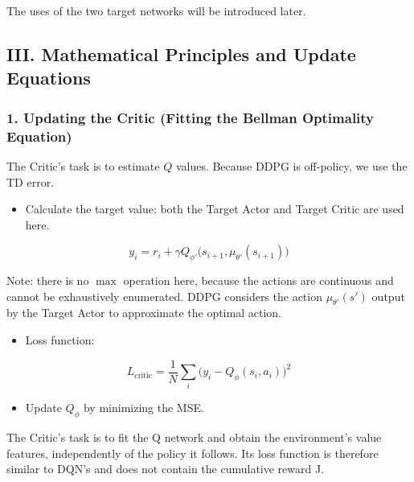 The uses of the two target networks will be introduced later.

\hypertarget{iii.-mathematical-principles-and-update-equations}{%
\subsection{III. Mathematical Principles and Update Equations}\label{iii.-mathematical-principles-and-update-equations}}

\hypertarget{updating-the-critic-fitting-the-bellman-optimality-equation}{%
\subsubsection{1. Updating the Critic (Fitting the Bellman Optimality Equation)}\label{updating-the-critic-fitting-the-bellman-optimality-equation}}

The Critic's task is to estimate \(Q\) values. Because DDPG is off-policy, we use the TD error.

\begin{itemize}
\tightlist
\item
  Calculate the target value: both the Target Actor and Target Critic are used here.
\end{itemize}

\[
y_i
=
r_i
+
\gamma Q_{\phi'}\bigl(
s_{i+1},
\mu_{\theta'}(s_{i+1})
\bigr)
\]

Note: there is no \(\max\) operation here, because the actions are continuous and cannot be exhaustively enumerated. DDPG considers the action \(\mu_{\theta'}(s')\) output by the Target Actor to approximate the optimal action.

\begin{itemize}
\tightlist
\item
{}
  Loss function:
\end{itemize}

\[
L_{\mathrm{critic}}
=
\frac{1}{N}
\sum_i
\bigl(
y_i-Q_\phi(s_i,a_i)
\bigr)^{2}
\]

\begin{itemize}
\tightlist
\item
  Update \(Q_\phi\) by minimizing the MSE.
\end{itemize}

The Critic's task is to fit the Q network and obtain the environment's value features, independently of the policy it follows. Its loss function is therefore similar to DQN's and does not contain the cumulative reward J.

